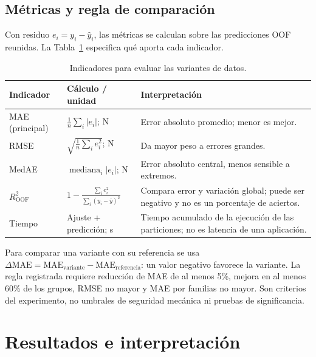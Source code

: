 \subsection{Métricas y regla de comparación}
Con residuo $e_i=y_i-\widehat y_i$, las métricas se calculan sobre las predicciones OOF reunidas. La Tabla~\ref{tab:metricas} especifica qué aporta cada indicador.
\begin{table}[htbp]
\centering\small{}
\caption{Indicadores para evaluar las variantes de datos.}
\label{tab:metricas}
\begin{tabularx}{\linewidth}{@{}l l X@{}}
\toprule
Indicador & Cálculo / unidad & Interpretación \\
\midrule
MAE (principal) & $\frac{1}{n}\sum_i|e_i|$; N & Error absoluto promedio; menor es mejor. \\
\addlinespace
RMSE & $\sqrt{\frac{1}{n}\sum_i e_i^2}$; N & Da mayor peso a errores grandes. \\
\addlinespace
MedAE & $\operatorname{mediana}_i|e_i|$; N & Error absoluto central, menos sensible a extremos. \\
\addlinespace
$R^2_{\mathrm{OOF}}$ & $1-\frac{\sum_i e_i^2}{\sum_i(y_i-\bar y)^2}$ & Compara error y variación global; puede ser negativo y no es un porcentaje de aciertos. \\
\addlinespace
Tiempo & Ajuste + predicción; s & Tiempo acumulado de la ejecución de las particiones; no es latencia de una aplicación. \\
\bottomrule
\end{tabularx}
\end{table}

Para comparar una variante con su referencia se usa $\Delta\mathrm{MAE}=\mathrm{MAE}_{\mathrm{variante}}-\mathrm{MAE}_{\mathrm{referencia}}$: un valor negativo favorece la variante. La regla registrada requiere reducción de MAE de al menos 5\%, mejora en al menos 60\% de los grupos, RMSE no mayor y MAE por familias no mayor. Son criterios del experimento, no umbrales de seguridad mecánica ni pruebas de significancia.

\section{Resultados e interpretación}
\label{sec:resultados}
